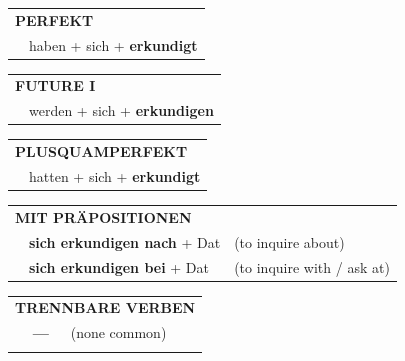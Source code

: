 \documentclass[10pt,a4paper]{revtex4-2}
\begin{document}
\begin{verbbox}
 \begin{tabular}{rl}
     \multicolumn{2}{l}{\textbf{PERFEKT}}\\
   & haben + sich + \textbf{erkundigt}\\
  \end{tabular}
\hfill
   \begin{tabular}{rl}
    \multicolumn{2}{l}{\textbf{FUTURE I} }\\
   & werden + sich + \textbf{erkundigen}\\
  \end{tabular}
\hfill
   \begin{tabular}{rl}
      \multicolumn{2}{l}{\textbf{PLUSQUAMPERFEKT}}\\
   & hatten + sich + \textbf{erkundigt}\\
  \end{tabular}

   \vspace{10pt}

   \begin{tabular}{lll}
      \multicolumn{3}{l}{\textbf{MIT PRÄPOSITIONEN}}\\
& \textbf{sich erkundigen nach} + Dat & (to inquire about)\\
& \textbf{sich erkundigen bei} + Dat & (to inquire with / ask at)\\
\end{tabular}
  \hfill
   \begin{tabular}{lll}
      \multicolumn{3}{l}{\textbf{TRENNBARE VERBEN}}\\
 & \textbf{---} & (none common)\\
\vspace{10pt}
  \end{tabular}

  \vspace{-5pt}

\end{verbbox}
\end{document}
